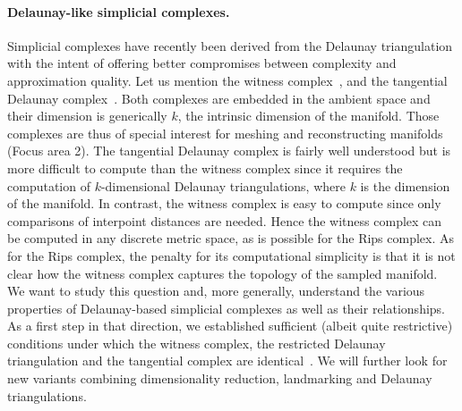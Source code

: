 \paragraph{Delaunay-like  simplicial complexes.} 
Simplicial complexes have recently been derived from the Delaunay
triangulation with the intent of offering better compromises between
complexity and approximation quality. Let us mention the witness
complex~\cite{cds-tewc-2004}, and the tangential Delaunay
complex~\cite{geometrica-7142i}. Both complexes are embedded in the
ambient space and their dimension is generically $k$, the intrinsic
dimension of the manifold. Those complexes are thus of special
interest for meshing and reconstructing manifolds (Focus area 2).  The
tangential Delaunay complex is fairly well understood but is more
difficult to compute than the witness complex since it requires the
computation of $k$-dimensional Delaunay triangulations, where $k$ is
the dimension of the manifold.  In contrast, the witness complex is
easy to compute since only comparisons of interpoint distances are
needed. Hence the witness complex can be computed in any discrete
metric space, as is possible for the Rips complex.  As for the Rips
complex, the penalty for its computational simplicity is that it is
not clear how the witness complex captures the topology of the sampled
manifold.
We want to study this question and, more generally, understand the various properties of Delaunay-based simplicial complexes as well as their relationships. As a  first step in that direction, we established sufficient (albeit quite restrictive) conditions under which the witness complex, the restricted Delaunay triangulation and the tangential complex are identical~\cite{boissonnat2012stab}. We will further look for new
variants combining dimensionality reduction, landmarking and Delaunay triangulations.

